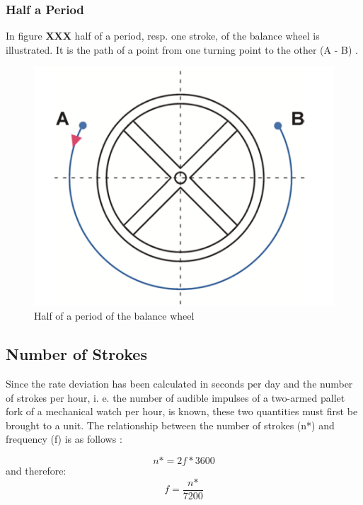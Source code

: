 \documentclass[12pt, a4paper]{report}
\begin{document}
\subsubsection{Half a Period}
In figure \textbf{XXX} half of a period, resp. one stroke, of the balance wheel is illustrated. It is the path of a point from one turning point to the other (A - B) \cite{Witschi_basics}.
    \begin{figure}[H]
    \centering
    \includegraphics[scale=0.4]{Images/Halfperiod.png}
    
    \caption{Half of a period of the balance wheel \cite{Witschi_basics}}
    \end{figure}
\bigskip
    
    \subsection{Number of Strokes}
    Since the rate deviation has been calculated in seconds per day and the number of strokes per hour, i. e. the number of audible impulses of a two-armed pallet fork of a mechanical watch per hour, is known, these two quantities must first be brought to a unit. The relationship between the number of strokes (n*) and frequency (f) is as follows \cite{Krug1987}: 
    
    \begin{displaymath}
    n\text{*} = 2f*3600
     \end{displaymath}
     and therefore:
     \begin{displaymath}
      f = \frac{n\text{*}}{7200}
     \end{displaymath}
     
\end{document}
